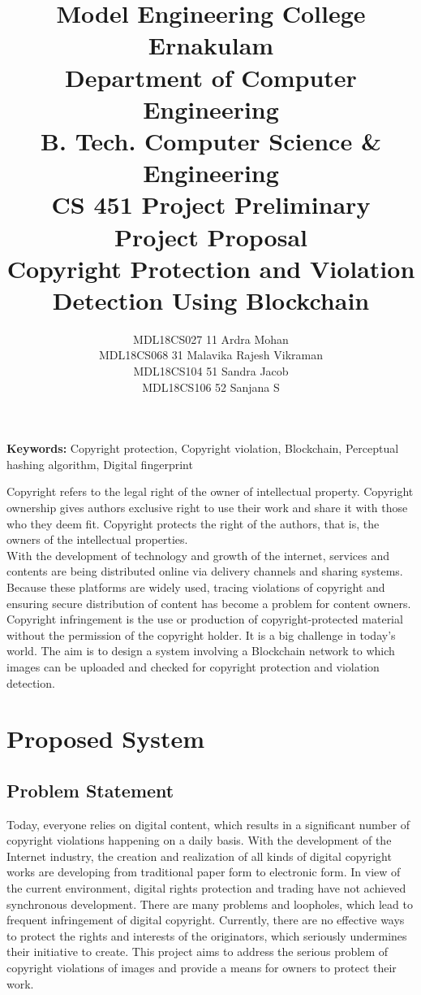 \documentclass[10pt]{article}
\title{Model Engineering College Ernakulam
\\Department of Computer Engineering
\\B. Tech. Computer Science \& Engineering 
\\CS 451 Project Preliminary
\\ Project Proposal
\\Copyright Protection and Violation Detection Using Blockchain
}
\author{
MDL18CS027 11 Ardra Mohan
\\MDL18CS068 31 Malavika Rajesh Vikraman
\\MDL18CS104 51 Sandra Jacob
\\MDL18CS106 52 Sanjana S}
\begin{document}
\maketitle
{\bf Keywords:} Copyright protection, Copyright violation, Blockchain, Perceptual hashing algorithm, Digital fingerprint

\abstract{}
Copyright refers to the legal right of the owner of intellectual property. Copyright ownership gives authors exclusive right to use their work and share it with those who they deem fit. Copyright protects the right of the authors, that is, the owners of the intellectual properties. \\
\indent With the development of technology and growth of the internet, services and contents are being distributed online via delivery channels and sharing systems. Because these platforms are widely used, tracing violations of copyright and ensuring secure distribution of content has become a problem for content owners. Copyright infringement is the use or production of copyright-protected material without the permission of the copyright holder. It is a big challenge in today’s world. The aim is to design a system involving a Blockchain network to which images can be uploaded and checked for copyright protection and violation detection.
\section{Proposed System}
\subsection{Problem Statement}
Today, everyone relies on digital content, which results in a significant number of copyright violations happening on a daily basis. With the development of the Internet industry, the creation and realization of all kinds of digital copyright works are developing from traditional paper form to electronic form. In view of the current environment, digital rights protection and trading have not achieved synchronous development. There are many problems and loopholes, which lead to frequent infringement of digital copyright. Currently, there are no effective ways to protect the rights and interests of the originators, which seriously undermines their initiative to create. This project aims to address the serious problem of copyright violations of images and provide a means for owners to protect their work. 
\end{document}
